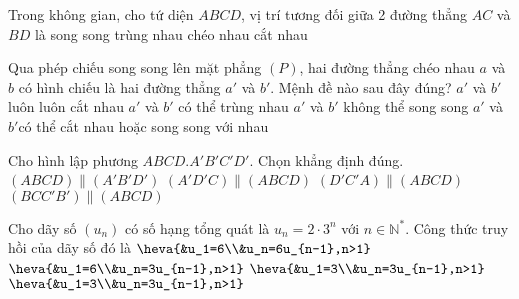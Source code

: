 \begin{ex}%
	Trong không gian, cho tứ diện $ABCD$, vị trí tương đối giữa 2 đường thẳng $AC$ và $BD$ là
	\choice
	{song song}
	{trùng nhau}
	{\True chéo nhau}
	{cắt nhau}
\end{ex}

\begin{ex}%
	Qua phép chiếu song song lên mặt phẳng $(P)$, hai đường thẳng chéo nhau $a$ và $b$ có hình chiếu là hai đường thẳng $a'$ và $b'$. Mệnh đề nào sau đây đúng?
	\choice
	{$a'$ và $b'$ luôn luôn cắt nhau} {$a'$ và $b'$ có thể trùng nhau} {$a'$ và $b'$ không thể song song} {\True $a'$ và $b'$có thể cắt nhau hoặc song song với nhau}
\end{ex}

\begin{ex}%
	Cho hình lập phương $ABCD.A' B' C' D'$. Chọn khẳng định đúng.
	\choice
	{\True $(ABCD) \parallel \left(A' B' D'\right)$}
	{$\left(A' D' C\right) \parallel(A B C D)$}
	{ $\left(D' C' A\right) \parallel(A B C D)$}
	{$\left(B C C' B'\right) \parallel(A B C D)$}
\end{ex}

\begin{ex}%
	Cho dãy số $\left(u_n\right)$ có số hạng tổng quát là $u_{n}=2\cdot3^n$ với $n\in\mathbb{N^*}$. Công thức truy hồi của dãy số đó là
	\choice
	{$\heva{&u_1=6\\&u_n=6u_{n-1},n>1}$}
	{\True $\heva{&u_1=6\\&u_n=3u_{n-1},n>1}$}
	{$\heva{&u_1=3\\&u_n=3u_{n-1},n>1}$}
	{$\heva{&u_1=3\\&u_n=3u_{n-1},n>1}$}
\end{ex}

